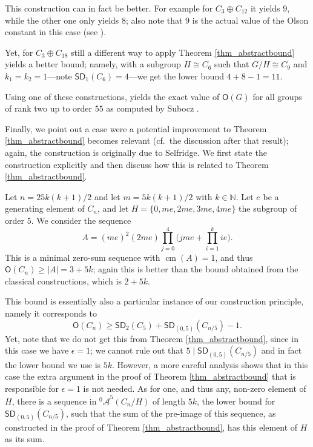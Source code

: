 \documentclass{amsart}
\theoremstyle{definition}
\numberwithin{equation}{section}
\begin{document}
This construction can in fact be better. For example for
$C_3 \oplus C_{12}$ it yields $9$, while the other one only yields $8$;
also note that $9$ is the actual value of the Olson constant in this case
(see \cite{sub}).

Yet, for $C_3\oplus C_{18}$ still a different way to apply
Theorem \ref{thm_abstractbound} yields a better bound; namely,
with a subgroup $H\cong C_6$ such that $G/H \cong C_9$ and
$k_1 =k_2=1$---note ${\mathsf{SD}}_1(C_6)=4$---we get the lower bound $4+8-1=11$.

Using one of these constructions, yields
the exact value of ${\mathsf{O}}(G)$ for all groups of rank two up to order $55$
as computed by Subocz \cite{sub}.

Finally, we point out a case were a potential improvement to Theorem \ref{thm_abstractbound} becomes relevant (cf.~the discussion after that result); again, the construction is originally due to Selfridge.
We first state the construction explicitly and then discuss how this is related to Theorem \ref{thm_abstractbound}.

Let $n=25 k(k+1)/2$ and let $m= 5k(k+1)/2$ with $k \in \mathbb{N}$.
Let $e$ be a generating element of $C_n$, and let $ H = \{ 0, me, 2me, 3me, 4me \} $ the subgroup of order $5$.
We consider the sequence
\[A=(me)^2 (2me) \prod_{j=0}^4 \bigl ( jme + \prod_{i=1}^k ie \bigr ).\]
This is a minimal zero-sum sequence with $\operatorname{cm}(A)= 1$, and thus ${\mathsf{O}}(C_n)\ge |A|= 3 + 5k$;
again this is better than the bound obtained from the classical constructions, which is $2+ 5k$.

This bound is essentially also a particular instance of our construction principle,
namely it corresponds to 
\[ {\mathsf{O}}(C_n) \ge {\mathsf{SD}}_2(C_5) + {\mathsf{SD}}_{(0,5)}(C_{n/5}) - 1.\]
Yet, note that we do not get this from Theorem \ref{thm_abstractbound}, since in this case we have $\epsilon = 1$; we cannot rule out that  $5 \mid {\mathsf{SD}}_{(0,5)}(C_{n/5})$ and in fact the lower bound we use is $5k$. 
However, a more careful analysis shows that in this case the extra argument in the proof of Theorem \ref{thm_abstractbound} that is responsible for $\epsilon = 1$ is not needed. 
As for one, and thus any, non-zero element of $H$, there is a sequence in ${{}^{{0}}\!\mathcal{A}}^5(C_n/H)$ of length $5k$, the lower bound for ${\mathsf{SD}}_{(0,5)}(C_{n/5})$, such that the sum of the pre-image of this sequence, as constructed in the proof of Theorem \ref{thm_abstractbound}, has this element of $H$ as its sum. 
 
\end{document}
